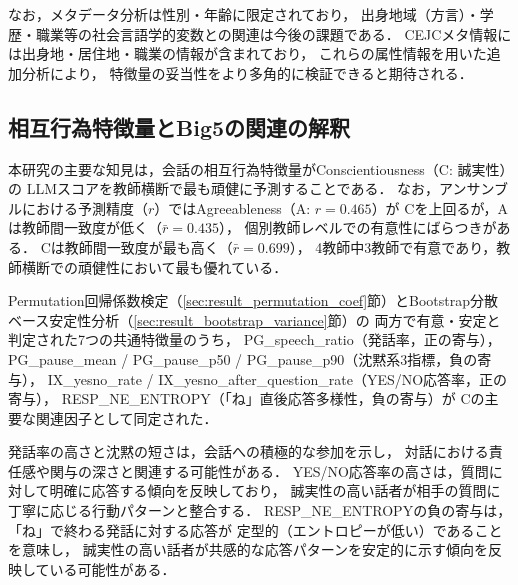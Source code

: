 \documentclass[dvipdfmx,11pt,a4paper]{bxjsarticle}
\begin{document}
なお，メタデータ分析は性別・年齢に限定されており，
出身地域（方言）・学歴・職業等の社会言語学的変数との関連は今後の課題である．
CEJCメタ情報には出身地・居住地・職業の情報が含まれており，
これらの属性情報を用いた追加分析により，
特徴量の妥当性をより多角的に検証できると期待される．

\subsection{相互行為特徴量とBig5の関連の解釈}

本研究の主要な知見は，会話の相互行為特徴量がConscientiousness（C: 誠実性）の
LLMスコアを教師横断で最も頑健に予測することである．
なお，アンサンブルにおける予測精度（$r$）ではAgreeableness（A: $r = 0.465$）が
Cを上回るが，Aは教師間一致度が低く（$\bar{r} = 0.435$），
個別教師レベルでの有意性にばらつきがある．
Cは教師間一致度が最も高く（$\bar{r} = 0.699$），
4教師中3教師で有意であり，教師横断での頑健性において最も優れている．

Permutation回帰係数検定（\ref{sec:result_permutation_coef}節）とBootstrap分散ベース安定性分析（\ref{sec:result_bootstrap_variance}節）の
両方で有意・安定と判定された7つの共通特徴量のうち，
PG\_speech\_ratio（発話率，正の寄与），
PG\_pause\_mean / PG\_pause\_p50 / PG\_pause\_p90（沈黙系3指標，負の寄与），
IX\_yesno\_rate / IX\_yesno\_after\_question\_rate（YES/NO応答率，正の寄与），
RESP\_NE\_ENTROPY（「ね」直後応答多様性，負の寄与）が
Cの主要な関連因子として同定された．

発話率の高さと沈黙の短さは，会話への積極的な参加を示し，
対話における責任感や関与の深さと関連する可能性がある．
YES/NO応答率の高さは，質問に対して明確に応答する傾向を反映しており，
誠実性の高い話者が相手の質問に丁寧に応じる行動パターンと整合する．
RESP\_NE\_ENTROPYの負の寄与は，「ね」で終わる発話に対する応答が
定型的（エントロピーが低い）であることを意味し，
誠実性の高い話者が共感的な応答パターンを安定的に示す傾向を反映している可能性がある．
\end{document}
